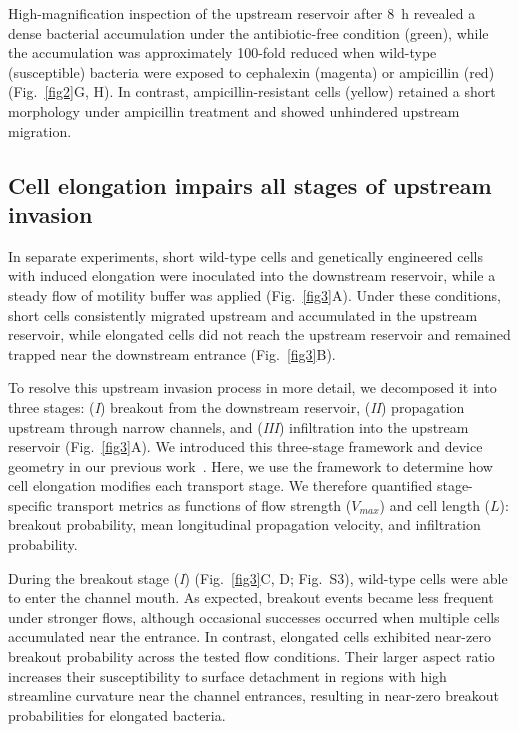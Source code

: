 \documentclass[twoside,twocolumn,9pt]{article}
\begin{document}
    High-magnification inspection of the upstream reservoir after \SI{8}{\hour} revealed a dense bacterial accumulation under the antibiotic-free condition (green), while the accumulation was approximately 100-fold reduced when wild-type (susceptible) bacteria were exposed to cephalexin (magenta) or ampicillin (red) (Fig.~\ref{fig2}G, H). In contrast, ampicillin-resistant cells (yellow) retained a short morphology under ampicillin treatment and showed unhindered upstream migration.
    
    \subsection*{Cell elongation impairs all stages of upstream invasion}

    In separate experiments, short wild-type cells and genetically engineered cells with induced elongation were inoculated into the downstream reservoir, while a steady flow of motility buffer was applied (Fig.~\ref{fig3}A). Under these conditions, short cells consistently migrated upstream and accumulated in the upstream reservoir, while elongated cells did not reach the upstream reservoir and remained trapped near the downstream entrance (Fig.~\ref{fig3}B).
    
    To resolve this upstream invasion process in more detail, we decomposed it into three stages: (\textit{I}) breakout from the downstream reservoir, (\textit{II}) propagation upstream through narrow channels, and (\textit{III}) infiltration into the upstream reservoir (Fig.~\ref{fig3}A). We introduced this three-stage framework and device geometry in our previous work~\cite{Tao2026-yc}. Here, we use the framework to determine how cell elongation modifies each transport stage. We therefore quantified stage-specific transport metrics as functions of flow strength ($V_{max}$) and cell length ($L$): breakout probability, mean longitudinal propagation velocity, and infiltration probability.
    
    During the breakout stage (\textit{I}) (Fig.~\ref{fig3}C, D; Fig.~S3), wild-type cells were able to enter the channel mouth. As expected, breakout events became less frequent under stronger flows, although occasional successes occurred when multiple cells accumulated near the entrance. In contrast, elongated cells exhibited near-zero breakout probability across the tested flow conditions. Their larger aspect ratio increases their susceptibility to surface detachment in regions with high streamline curvature near the channel entrances, resulting in near-zero breakout probabilities for elongated bacteria.
    
\end{document}
